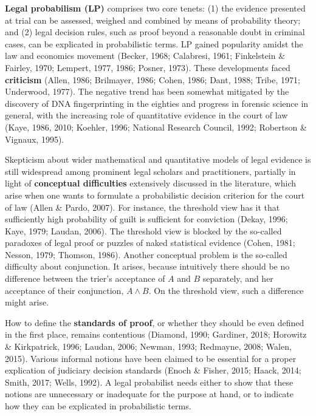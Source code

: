 \documentclass[11pt,dvipsnames,enabledeprecatedfontcommands]{scrartcl}
\begin{document}
\normalsize 

\vspace{1mm}

\textbf{Legal probabilism (LP)} comprises two core tenets: (1) the
evidence presented at trial can be assessed, weighed and combined by
means of probability theory; and (2) legal decision rules, such as proof
beyond a reasonable doubt in criminal cases, can be explicated in
probabilistic terms. LP gained popularity amidst the law and economics
movement (Becker, 1968; Calabresi, 1961; Finkelstein \& Fairley, 1970;
Lempert, 1977, 1986; Posner, 1973). These developments faced
\textbf{criticism} (Allen, 1986; Brilmayer, 1986; Cohen, 1986; Dant,
1988; Tribe, 1971; Underwood, 1977). The negative trend has been
somewhat mitigated by the discovery of DNA fingerprinting in the
eighties and progress in forensic science in general, with the
increasing role of quantitative evidence in the court of law (Kaye,
1986, 2010; Koehler, 1996; National Research Council, 1992; Robertson \&
Vignaux, 1995).

Skepticism about wider mathematical and quantitative models of legal
evidence is still widespread among prominent legal scholars and
practitioners, partially in light of \textbf{conceptual difficulties}
extensively discussed in the literature, which arise when one wants to
formulate a probabilistic decision criterion for the court of law (Allen
\& Pardo, 2007). For instance, the threshold view has it that
sufficiently high probability of guilt is sufficient for conviction
(Dekay, 1996; Kaye, 1979; Laudan, 2006). The threshold view is blocked
by the so-called paradoxes of legal proof or puzzles of naked
statistical evidence (Cohen, 1981; Nesson, 1979; Thomson, 1986). Another
conceptual problem is the so-called difficulty about conjunction. It
arises, because intuitively there should be no difference between the
trier's acceptance of \(A\) and \(B\) separately, and her acceptance of
their conjunction, \(A\wedge B\). On the threshold view, such a
difference might arise.

How to define the \textbf{standards of proof}, or whether they should be
even defined in the first place, remains contentious (Diamond, 1990;
Gardiner, 2018; Horowitz \& Kirkpatrick, 1996; Laudan, 2006; Newman,
1993; Redmayne, 2008; Walen, 2015). Various informal notions have been
claimed to be essential for a proper explication of judiciary decision
standards (Enoch \& Fisher, 2015; Haack, 2014; Smith, 2017; Wells,
1992). A legal probabilist needs either to show that these notions are
unnecessary or inadequate for the purpose at hand, or to indicate how
they can be explicated in probabilistic terms.
\end{document}
